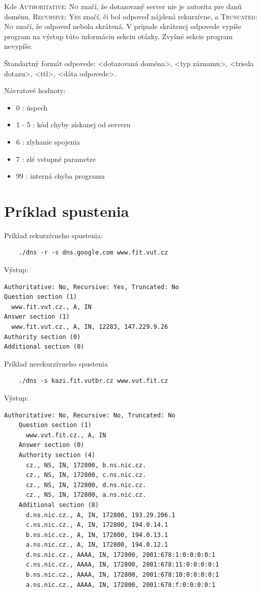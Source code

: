 Kde \textsc{Authoritative: No} značí, že dotazovaný server nie je autorita pre danú doménu, \textsc{Recursive: Yes} značí, či bol odpoveď nájdená rekurzívne,
a \textsc{Truncated: No} značí, že odpoveď nebola skrátená. V prípade skrátenej odpovede vypíše program na výstup túto informáciu sekciu otázky. Zvyšné sekcie program nevypíše.

\noindent Štandartný formát odpovede: <dotazovaná doména>, <typ záznamu>, <trieda dotazu>, <ttl>, <dáta odpovede>. 

Návratové hodnoty:
\begin{itemize}
    \item 0 : úspech
    \item 1 - 5 : kód chyby získanej od serveru
    \item 6 : zlyhanie spojenia
    \item 7 : zlé vstupné parametre
    \item 99 : interná chyba programu
\end{itemize}


\section{Príklad spustenia}
\label{Príklad spustenia}

Príklad rekurzívneho spustenia:

\begin{verbatim}
    ./dns -r -s dns.google.com www.fit.vut.cz  
\end{verbatim}

\noindent Výstup:

\begin{verbatim}
Authoritative: No, Recursive: Yes, Truncated: No
Question section (1)
  www.fit.vut.cz., A, IN
Answer section (1)
  www.fit.vut.cz., A, IN, 12283, 147.229.9.26
Authority section (0)
Additional section (0)
\end{verbatim}

Príklad nerekurzívneho spustenia

\begin{verbatim}
    ./dns -s kazi.fit.vutbr.cz www.vut.fit.cz
\end{verbatim}

\noindent Výstup:
\begin{verbatim}
Authoritative: No, Recursive: No, Truncated: No
    Question section (1)
      www.vut.fit.cz., A, IN
    Answer section (0)
    Authority section (4)
      cz., NS, IN, 172800, b.ns.nic.cz.
      cz., NS, IN, 172800, c.ns.nic.cz.
      cz., NS, IN, 172800, d.ns.nic.cz.
      cz., NS, IN, 172800, a.ns.nic.cz.
    Additional section (8)
      d.ns.nic.cz., A, IN, 172800, 193.29.206.1
      c.ns.nic.cz., A, IN, 172800, 194.0.14.1
      b.ns.nic.cz., A, IN, 172800, 194.0.13.1
      a.ns.nic.cz., A, IN, 172800, 194.0.12.1
      d.ns.nic.cz., AAAA, IN, 172800, 2001:678:1:0:0:0:0:1
      c.ns.nic.cz., AAAA, IN, 172800, 2001:678:11:0:0:0:0:1
      b.ns.nic.cz., AAAA, IN, 172800, 2001:678:10:0:0:0:0:1
      a.ns.nic.cz., AAAA, IN, 172800, 2001:678:f:0:0:0:0:1
\end{verbatim}


